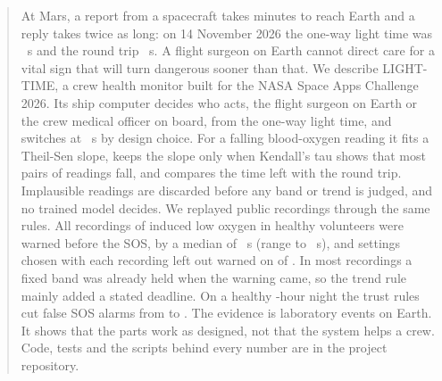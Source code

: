\begin{abstract}
At Mars, a report from a spacecraft takes minutes to reach Earth and a reply takes twice as long: on 14 November 2026 the one-way light time was \numMarsOneWayS~s and the round trip \numMarsRoundTripS~s. A flight surgeon on Earth cannot direct care for a vital sign that will turn dangerous sooner than that. We describe LIGHT-TIME, a crew health monitor built for the NASA Space Apps Challenge 2026. Its ship computer decides who acts, the flight surgeon on Earth or the crew medical officer on board, from the one-way light time, and switches at \numCrewFirstAtS~s by design choice. For a falling blood-oxygen reading it fits a Theil-Sen slope, keeps the slope only when Kendall's tau shows that most pairs of readings fall, and compares the time left with the round trip. Implausible readings are discarded before any band or trend is judged, and no trained model decides. We replayed public recordings through the same rules. All \numUwEvents{} recordings of induced low oxygen in healthy volunteers were warned before the SOS, by a median of \numUwMedianLeadS~s (range \numUwMinLeadS{} to \numUwMaxLeadS~s), and settings chosen with each recording left out warned on \numHeldoutWarned{} of \numUwEvents. In most recordings a fixed band was already held when the warning came, so the trend rule mainly added a stated deadline. On a healthy \numControlHours-hour night the trust rules cut false SOS alarms from \numControlFalseSosRaw{} to \numControlFalseSosSettle. The evidence is \numUwEvents{} laboratory events on Earth. It shows that the parts work as designed, not that the system helps a crew. Code, tests and the scripts behind every number are in the project repository.
\end{abstract}
